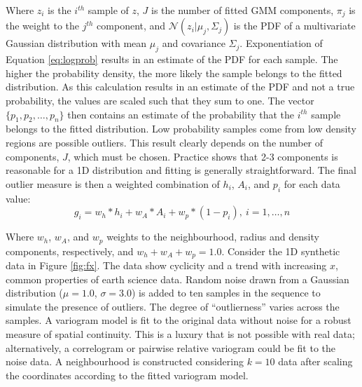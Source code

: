 Where $z_{i}$ is the $i^{th}$ sample of $z$, $J$ is the number of fitted \gls{GMM} components, $\pi_{j}$ is the weight to the $j^{th}$ component, and $\mathcal{N}(z_{i}|\mu_{j}, \Sigma_{j})$ is the \gls{PDF} of a multivariate Gaussian distribution with mean $\mu_{j}$ and covariance $\Sigma_{j}$. Exponentiation of Equation \ref{eq:logprob} results in an estimate of the \gls{PDF} for each sample. The higher the probability density, the more likely the sample belongs to the fitted distribution. As this calculation results in an estimate of the \gls{PDF} and not a true probability, the values are scaled such that they sum to one. The vector $\{p_{1}, p_{2}, \dots, p_{n}\}$ then contains an estimate of the probability that the $i^{th}$ sample belongs to the fitted distribution. Low probability samples come from low density regions are possible outliers. This result clearly depends on the number of components, $J$, which must be chosen. Practice shows that 2-3 components is reasonable for a \gls{1D} distribution and fitting is generally straightforward. The final outlier measure is then a weighted combination of $h_{i}$, $A_{i}$, and $p_{i}$ for each data value:
\begin{equation}
    g_{i} = w_{h}*h_{i} + w_{A}*A_{i} + w_{p}*(1-p_{i}), \ i = 1, \dots, n
    \label{eq:outlier}
\end{equation}

Where $w_{h}$, $w_{A}$, and $w_{p}$ weights to the neighbourhood, radius and density components, respectively, and $w_{h}+w_{A}+w_{p}=1.0$. Consider the \gls{1D} synthetic data in Figure \ref{fig:fx}. The data show cyclicity and a trend with increasing $x$, common properties of earth science data. Random noise drawn from a Gaussian distribution ($\mu=1.0$, $\sigma=3.0$) is added to ten samples in the sequence to simulate the presence of outliers. The degree of ``outlierness'' varies across the samples. A variogram model is fit to the original data without noise for a robust measure of spatial continuity. This is a luxury that is not possible with real data; alternatively, a correlogram or pairwise relative variogram could be fit to the noise data. A neighbourhood is constructed considering $k=10$ data after scaling the coordinates according to the fitted variogram model.

